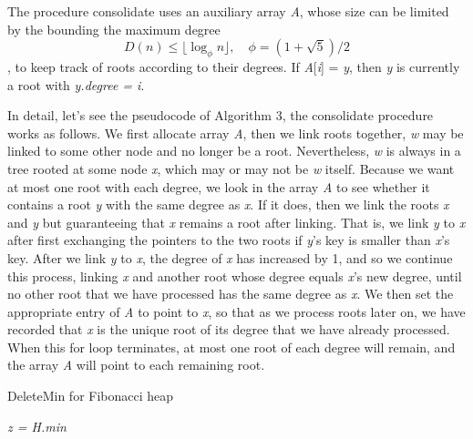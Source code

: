 \documentclass[12pt]{article}
\begin{document}
    The procedure consolidate uses an auxiliary array \emph{A}, whose size can be limited by the bounding the maximum degree
    $$D(n) \le \lfloor\log_{\phi}n\rfloor,\quad \phi = (1 + \sqrt{5}) / 2$$
    , to keep track of roots according to their degrees. If \emph{A}[\emph{i}] = \emph{y}, then \emph{y} is currently a root
    with \emph{y.degree = i}.

    In detail, let's see the pseudocode of Algorithm 3, the consolidate procedure works as follows. 
    We first allocate array \emph{A}, then we link roots together, \emph{w} may be linked
    to some other node and no longer be a root. Nevertheless, \emph{w} is always in a tree
    rooted at some node \emph{x}, which may or may not be \emph{w} itself. Because we want at
    most one root with each degree, we look in the array \emph{A} to see whether it contains
    a root \emph{y} with the same degree as \emph{x}. If it does, then we link the roots \emph{x} and \emph{y} but
    guaranteeing that \emph{x} remains a root after linking. That is, we link \emph{y} to \emph{x} after first
    exchanging the pointers to the two roots if \emph{y}’s key is smaller than \emph{x}’s key. After
    we link \emph{y} to \emph{x}, the degree of \emph{x} has increased by 1, and so we continue this process,
    linking \emph{x} and another root whose degree equals \emph{x}’s new degree, until no other root
    that we have processed has the same degree as \emph{x}. We then set the appropriate entry
    of \emph{A} to point to \emph{x}, so that as we process roots later on, we have recorded that \emph{x} is
    the unique root of its degree that we have already processed. When this for loop
    terminates, at most one root of each degree will remain, and the array \emph{A} will point
    to each remaining root.

    \begin{algorithm}
        \caption{DeleteMin for Fibonacci heap}
        \LinesNumbered
        \emph{z = H.min}\;
    \end{algorithm}
\end{document}
